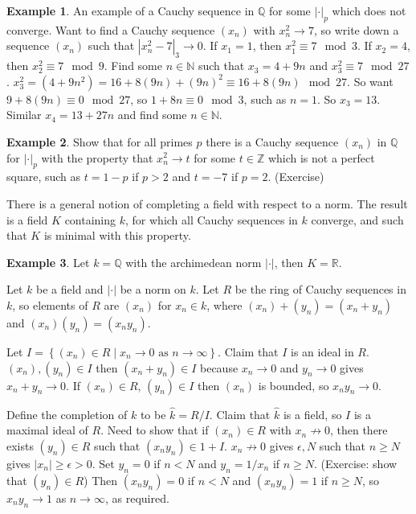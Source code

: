 \documentclass{article}
\newcommand{\N}{\mathbb{N}}
\newcommand{\Z}{\mathbb{Z}}
\newcommand{\Q}{\mathbb{Q}}
\newcommand{\R}{\mathbb{R}}
\newcommand{\rb}[1]{\left( #1 \right)}
\newcommand{\cb}[1]{\left\{ #1 \right\}}
\newcommand{\abs}[1]{\left\lvert #1 \right\rvert}
\theoremstyle{definition}\newtheorem{definition}{Definition}[section]
\theoremstyle{definition}\newtheorem{remark}[definition]{Remark}
\theoremstyle{definition}\newtheorem*{example}{Example}
\theoremstyle{definition}\newtheorem*{note}{Note}
\begin{document}
\begin{example}
An example of a Cauchy sequence in $ \Q $ for some $ \abs{\cdot}_p $ which does not converge. Want to find a Cauchy sequence $ \rb{x_n} $ with $ x_n^2 \to 7 $, so write down a sequence $ \rb{x_n} $ such that $ \abs{x_n^2 - 7}_3 \to 0 $. If $ x_1 = 1 $, then $ x_1^2 \equiv 7 \mod 3 $. If $ x_2 = 4 $, then $ x_2^2 \equiv 7 \mod 9 $. Find some $ n \in \N $ such that $ x_3 = 4 + 9n $ and $ x_3^2 \equiv 7 \mod 27 $. $ x_3^2 = \rb{4 + 9n^2} = 16 + 8\rb{9n} + \rb{9n}^2 \equiv 16 + 8\rb{9n} \mod 27 $. So want $ 9 + 8\rb{9n} \equiv 0 \mod 27 $, so $ 1 + 8n \equiv 0 \mod 3 $, such as $ n = 1 $. So $ x_3 = 13 $. Similar $ x_4 = 13 + 27n $ and find some $ n \in \N $.
\end{example}

\begin{example}
Show that for all primes $ p $ there is a Cauchy sequence $ \rb{x_n} $ in $ \Q $ for $ \abs{\cdot}_p $ with the property that $ x_n^2 \to t $ for some $ t \in \Z $ which is not a perfect square, such as $ t = 1 - p $ if $ p > 2 $ and $ t = -7 $ if $ p = 2 $. (Exercise)
\end{example}

There is a general notion of completing a field with respect to a norm. The result is a field $ K $ containing $ k $, for which all Cauchy sequences in $ k $ converge, and such that $ K $ is minimal with this property.

\begin{example}
Let $ k = \Q $ with the archimedean norm $ \abs{\cdot} $, then $ K = \R $.
\end{example}


Let $ k $ be a field and $ \abs{\cdot} $ be a norm on $ k $. Let $ R $ be the ring of Cauchy sequences in $ k $, so elements of $ R $ are $ \rb{x_n} $ for $ x_n \in k $, where $ \rb{x_n} + \rb{y_n} = \rb{x_n + y_n} $ and $ \rb{x_n}\rb{y_n} = \rb{x_ny_n} $.

Let $ I = \cb{\rb{x_n} \in R \mid x_n \to 0 \text{ as } n \to \infty} $. Claim that $ I $ is an ideal in $ R $. $ \rb{x_n}, \rb{y_n} \in I $ then $ \rb{x_n + y_n} \in I $ because $ x_n \to 0 $ and $ y_n \to 0 $ gives $ x_n + y_n \to 0 $. If $ \rb{x_n} \in R $, $ \rb{y_n} \in I $ then $ \rb{x_n} $ is bounded, so $ x_ny_n \to 0 $.

Define the completion of $ k $ to be $ \widehat{k} = R / I $. Claim that $ \widehat{k} $ is a field, so $ I $ is a maximal ideal of $ R $. Need to show that if $ \rb{x_n} \in R $ with $ x_n \not\to 0 $, then there exists $ \rb{y_n} \in R $ such that $ \rb{x_ny_n} \in 1 + I $. $ x_n \not\to 0 $ gives $ \epsilon, N $ such that $ n \ge N $ gives $ \abs{x_n} \ge \epsilon > 0 $. Set $ y_n = 0 $ if $ n < N $ and $ y_n = 1 / x_n $ if $ n \ge N $. (Exercise: show that $ \rb{y_n} \in R $) Then $ \rb{x_ny_n} = 0 $ if $ n < N $ and $ \rb{x_ny_n} = 1 $ if $ n \ge N $, so $ x_ny_n \to 1 $ as $ n \to \infty $, as required.
\end{document}
